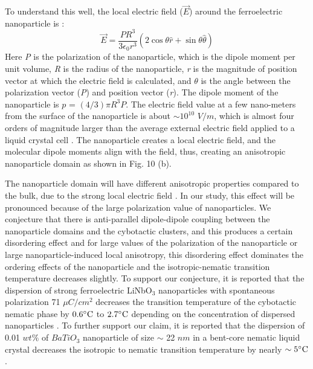 \documentclass[reprint,amsfonts,amsmath,amssymb,aps,pre,floatfix,10pt]{revtex4-1}
\begin{document}
To understand this well, the local electric field (\textit{$\vec{E}$}) around the ferroelectric nanoparticle is \cite{nayek2015superior_17, basu2014soft_40}:
\begin{equation}
\label{local_field}
\vec{E}=\frac{PR^3}{3\epsilon_0 r^3}(2\cos \theta \hat{r} + \sin \theta \hat{\theta})
\end{equation}
Here \textit{P} is the polarization of the nanoparticle, which is the dipole moment per unit volume, \textit{R} is the radius of the nanoparticle, \textit{r} is the magnitude of position vector at which the electric field is calculated, and $\theta$ is the angle between the polarization vector (\textit{P}) and position vector (\textit{r}). The dipole moment of the nanoparticle is $p$ = $(4/3)\pi R^3P$. The electric field value at a few nano-meters from the surface of the nanoparticle is about $\sim 10^{10}$ $V/m$, which is almost four orders of magnitude larger than the average external electric field applied to a liquid crystal cell \cite{basu2014soft_40}. The nanoparticle creates a local electric field, and the molecular dipole moments align with the field, thus, creating an anisotropic nanoparticle domain \cite{kumar2018nanodoping_12, lopatina2009theory_13} as shown in Fig. 10 (b).



The nanoparticle domain will have different anisotropic properties compared to the bulk, due to the strong local electric field \cite{basu2014soft_40}. In our study, this effect will be pronounced because of the large polarization value of nanoparticles. We conjecture that there is anti-parallel dipole-dipole coupling between the nanoparticle domains and the cybotactic clusters, and this produces a certain disordering effect and for large values of the polarization of the nanoparticle or large nanoparticle-induced local anisotropy, this disordering effect dominates the ordering effects of the nanoparticle and the isotropic-nematic transition temperature decreases slightly. To support our conjecture, it is reported that the dispersion of strong ferroelectric LiNbO$_{3}$ nanoparticles with spontaneous polarization 71 $\mu C/cm^2$ decreases the transition temperature of the cybotactic nematic phase by $0.6 ^{\circ}{\rm C}$ to $2.7 ^{\circ}{\rm C}$ depending on the concentration of dispersed nanoparticles \cite{derbali2020dielectric_33}. To further support our claim, it is reported that the dispersion of 0.01 $wt$$\%$ of $BaTiO_{3}$ nanoparticle of size $\sim$ 22 $nm$ in a bent-core nematic liquid crystal decreases the isotropic to nematic transition temperature by nearly $\sim 5 ^{\circ}{\rm C}$ \cite{khan2017elastic_11}. 
\end{document}

